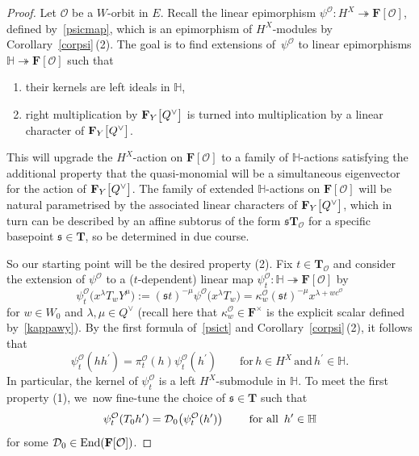 \documentclass[pdftex]{sigma}
\numberwithin{equation}{section}
\begin{document}
\begin{proof}
Let $\mathcal{O}$ be a $W$-orbit in $E$.
Recall the linear epimorphism $\psi^\mathcal{O}\colon H^X\twoheadrightarrow\mathbf{F}[\mathcal{O}]$,
defined by~\eqref{psicmap}, which is an epimorphism of $H^X$-modules by Corollary~\ref{corpsi}\,(2). The goal is to find extensions of~$\psi^{\mathcal{O}}$ to linear epimorphisms $\mathbb{H}\twoheadrightarrow\mathbf{F}[\mathcal{O}]$ such that
\begin{enumerate}\itemsep=0pt
\item[(1)] their kernels are left ideals in $\mathbb{H}$,
\item[(2)]
right multiplication by $\mathbf{F}_Y\smash{\bigl[Q^\vee\bigr]}$ is turned into multiplication by a linear character of $\mathbf{F}_Y\smash{\bigl[Q^\vee\bigr]}$.
\end{enumerate}
This will upgrade the $H^X$-action on $\mathbf{F}[\mathcal{O}]$ to a family of $\mathbb{H}$-actions satisfying the additional property that the quasi-monomial  will be a simultaneous eigenvector
for the action of $\mathbf{F}_Y\smash{\bigl[Q^\vee\bigr]}$. The family of extended $\mathbb{H}$-actions on $\mathbf{F}[\mathcal{O}]$ will be natural parametrised by the associated linear characters of $\mathbf{F}_Y\smash{\bigl[Q^\vee\bigr]}$, which in turn can be described by an affine subtorus of the form $\mathfrak{s}\mathbf{T}_{\mathcal{O}}$ for a specific basepoint $\mathfrak{s}\in\mathbf{T}$, so be determined in due course.

So our starting point will be the desired property (2). Fix $t\in\mathbf{T}_{\mathcal{O}}$ and consider the extension of $\psi^\mathcal{O}$ to a ($t$-dependent) linear map $\psi_{t}^\mathcal{O}\colon \mathbb{H}\twoheadrightarrow\mathbf{F}[\mathcal{O}]$ by
\begin{equation}\label{psict}
\psi_{t}^\mathcal{O}\bigl(x^\lambda T_wY^\mu\bigr):=(\mathfrak{s}t)^{-\mu}\psi^\mathcal{O}\bigl(x^\lambda T_w\bigr)=\kappa_w^\mathcal{O}(\mathfrak{s}t)^{-\mu}x^{\lambda+wc^\mathcal{O}}
\end{equation}
for $w\in W_0$ and $\lambda,\mu\in Q^\vee$ \big(recall here that $\kappa_w^\mathcal{O}\in\mathbf{F}^\times$ is the explicit scalar defined by~\eqref{kappawy}\big).
By the first formula of~\eqref{psict} and Corollary~\ref{corpsi}\,(2), it follows that
\[
\psi_{t}^\mathcal{O}(hh^\prime)
=\pi_{t}^\mathcal{O}(h)\psi_{t}^\mathcal{O}(h^\prime)\qquad \text{for}\, h\in H^X\, \text{and}\, h^\prime\in\mathbb{H}.
\]
In particular, the kernel of $\psi_{t}^\mathcal{O}$ is a left $H^X$-submodule in $\mathbb{H}$.
To meet the first property (1), we~now fine-tune the choice of $\mathfrak{s}\in\mathbf{T}$ such that
\[
\psi_{t}^{\mathcal{O}}(T_0h^\prime)=\mathcal{D}_0\bigl(\psi_{t}^\mathcal{O}(h^\prime)\bigr) \qquad \textup{ for all }\, h^\prime\in\mathbb{H}
\]
for some $\mathcal{D}_0\in\textup{End}(\mathbf{F}[\mathcal{O}])$.


\end{proof}
\end{document}
